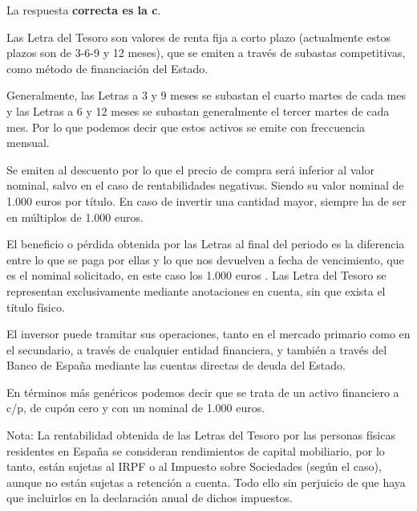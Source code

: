 \documentclass[
  letterpaper,
  DIV=11,
  numbers=noendperiod]{scrreprt}
\begin{document}
\begin{tcolorbox}[enhanced jigsaw, left=2mm, opacityback=0, colback=white, breakable, arc=.35mm, bottomrule=.15mm, rightrule=.15mm, toprule=.15mm, leftrule=.75mm, colframe=quarto-callout-tip-color-frame]
\begin{minipage}[t]{5.5mm}
\textcolor{quarto-callout-tip-color}{\faLightbulb}
\end{minipage}%
\begin{minipage}[t]{\textwidth - 5.5mm}

La respuesta \textbf{correcta es la c}.

Las Letra del Tesoro son valores de renta fija a corto plazo
(actualmente estos plazos son de 3-6-9 y 12 meses), que se emiten a
través de subastas competitivas, como método de financiación del Estado.

Generalmente, las Letras a 3 y 9 meses se subastan el cuarto martes de
cada mes y las Letras a 6 y 12 meses se subastan generalmente el tercer
martes de cada mes. Por lo que podemos decir que estos activos se emite
con freccuencia mensual.

Se emiten al descuento por lo que el precio de compra será inferior al
valor nominal, salvo en el caso de rentabilidades negativas. Siendo su
valor nominal de 1.000 euros por título. En caso de invertir una
cantidad mayor, siempre ha de ser en múltiplos de 1.000 euros.

El beneficio o pérdida obtenida por las Letras al final del periodo es
la diferencia entre lo que se paga por ellas y lo que nos devuelven a
fecha de vencimiento, que es el nominal solicitado, en este caso los
1.000 euros . Las Letra del Tesoro se representan exclusivamente
mediante anotaciones en cuenta, sin que exista el título físico.

El inversor puede tramitar sus operaciones, tanto en el mercado primario
como en el secundario, a través de cualquier entidad financiera, y
también a través del Banco de España mediante las cuentas directas de
deuda del Estado.

En términos más genéricos podemos decir que se trata de un activo
financiero a c/p, de cupón cero y con un nominal de 1.000 euros.

Nota: La rentabilidad obtenida de las Letras del Tesoro por las personas
físicas residentes en España se consideran rendimientos de capital
mobiliario, por lo tanto, están sujetas al IRPF o al Impuesto sobre
Sociedades (según el caso), aunque no están sujetas a retención a
cuenta. Todo ello sin perjuicio de que haya que incluirlos en la
declaración anual de dichos impuestos.

\end{minipage}%
\end{tcolorbox}
\end{document}

